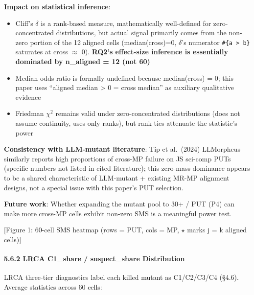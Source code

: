 \documentclass[review,12pt,authoryear]{elsarticle}
\providecommand{\tightlist}{\setlength{\itemsep}{0pt}\setlength{\parskip}{0pt}}
\begin{document}
\textbf{Impact on statistical inference}:

\begin{itemize}
\tightlist
\item
  Cliff's $\delta$ is a rank-based measure, mathematically well-defined for
  zero-concentrated distributions, but actual signal primarily comes
  from the non-zero portion of the 12 aligned cells (median(cross)=0,
  $\delta$'s numerator \texttt{\#\{a\ \textgreater{}\ b\}} saturates at cross $\approx$
  0). \textbf{RQ2's effect-size inference is essentially dominated by
  n\_aligned = 12 (not 60)}
\item
  Median odds ratio is formally undefined because median(cross) = 0;
  this paper uses ``aligned median \textgreater{} 0 = cross median'' as
  auxiliary qualitative evidence
\item
  Friedman $\chi$$^{2}$ remains valid under zero-concentrated distributions (does
  not assume continuity, uses only ranks), but rank ties attenuate the
  statistic's power
\end{itemize}

\textbf{Consistency with LLM-mutant literature}: Tip et al.~(2024)
LLMorpheus similarly reports high proportions of cross-MP failure on JS
sci-comp PUTs (specific numbers not listed in cited literature); this
zero-mass dominance appears to be a shared characteristic of LLM-mutant
+ existing MR-MP alignment designs, not a special issue with this
paper's PUT selection.

\textbf{Future work}: Whether expanding the mutant pool to 30+ / PUT
(P4) can make more cross-MP cells exhibit non-zero SMS is a meaningful
power test.

{[}Figure 1: 60-cell SMS heatmap (rows = PUT, cols = MP, $\star$ marks j = k
aligned cells){]}

\paragraph{5.6.2 LRCA C1\_share / suspect\_share
Distribution}\label{lrca-c1_share-suspect_share-distribution}

LRCA three-tier diagnostics label each killed mutant as C1/C2/C3/C4
(§4.6). Average statistics across 60 cells:
\end{document}
